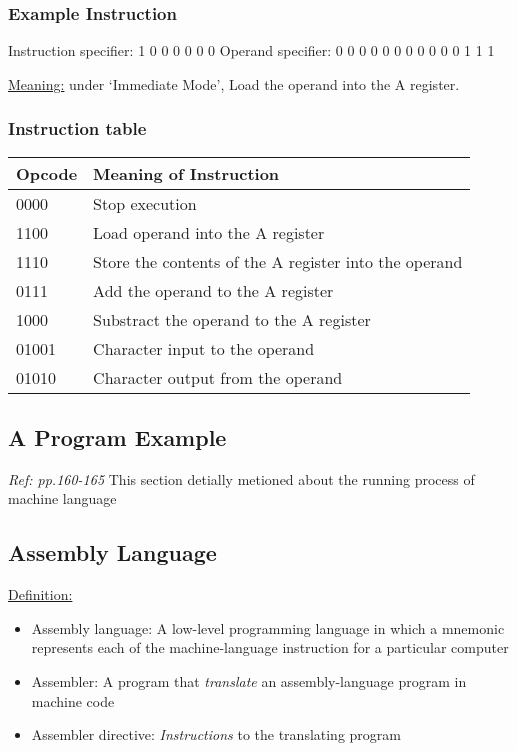 \documentclass[12pt]{article}
\begin{document}
\subsubsection{Example Instruction}
Instruction specifier: 1 0 0 0 0 0 0 \newline
Operand specifier: 0 0 0 0 0 0 0 0 0 0 0 1 1 1

\underline{Meaning:} under `Immediate Mode', Load the operand into the A register.

\subsubsection{Instruction table}
\begin{tabular}{|p{3cm}||p{10cm}|}
    \hline
    Opcode & Meaning of Instruction\\
    \hline
    \hline
    0000 & Stop execution\\
    1100 & Load operand into the A register\\
    1110 & Store the contents of the A register into the operand\\
    0111 & Add the operand to the A register\\
    1000 & Substract the operand to the A register\\
    01001 & Character input to the operand\\
    01010 & Character output from the operand\\
    \hline
\end{tabular}

\subsection{A Program Example}
\textit{Ref: pp.160-165}
This section detially metioned about the running process of machine language

\subsection{Assembly Language}
\underline{Definition:}
\begin{itemize}
    \item Assembly language: A low-level programming language in which a mnemonic represents each of the
    machine-language instruction for a particular computer
    \item Assembler: A program that \emph{translate} an assembly-language program in machine code
    \item Assembler directive: \emph{Instructions} to the translating program
\end{itemize}
\end{document}
